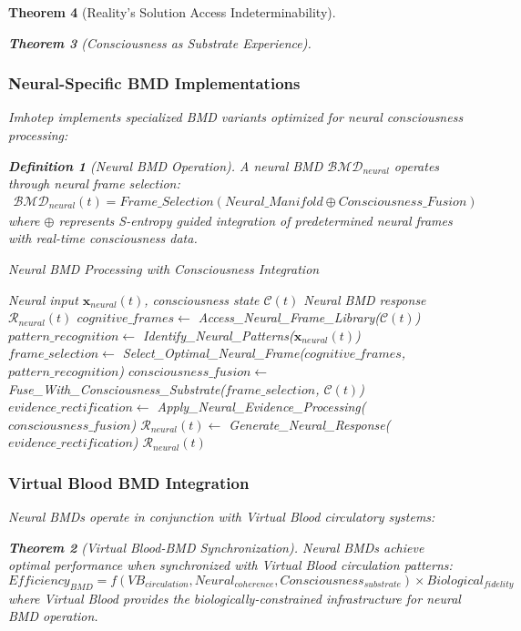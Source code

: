 \documentclass[12pt,a4paper]{article}
\newtheorem{theorem}{Theorem}[section]
\newtheorem{definition}[theorem]{Definition}
\theoremstyle{remark}
\begin{document}
\begin{theorem}[Reality's Solution Access Indeterminability]
\begin{theorem}[Consciousness as Substrate Experience]
\subsubsection{Neural-Specific BMD Implementations}

Imhotep implements specialized BMD variants optimized for neural consciousness processing:

\begin{definition}[Neural BMD Operation]
A neural BMD $\mathcal{BMD}_{neural}$ operates through neural frame selection:
\begin{align}
\mathcal{BMD}_{neural}(t) = Frame\_Selection(Neural\_Manifold \oplus Consciousness\_Fusion)
\end{align}
where $\oplus$ represents S-entropy guided integration of predetermined neural frames with real-time consciousness data.
\end{definition}

\begin{algorithm}
\caption{Neural BMD Processing with Consciousness Integration}
\begin{algorithmic}[1]
\REQUIRE Neural input $\mathbf{x}_{neural}(t)$, consciousness state $\mathcal{C}(t)$
\ENSURE Neural BMD response $\mathcal{R}_{neural}(t)$
\STATE $cognitive\_frames \leftarrow$ Access\_Neural\_Frame\_Library($\mathcal{C}(t)$)
\STATE $pattern\_recognition \leftarrow$ Identify\_Neural\_Patterns($\mathbf{x}_{neural}(t)$)
\STATE $frame\_selection \leftarrow$ Select\_Optimal\_Neural\_Frame($cognitive\_frames$, $pattern\_recognition$)
\STATE $consciousness\_fusion \leftarrow$ Fuse\_With\_Consciousness\_Substrate($frame\_selection$, $\mathcal{C}(t)$)
\STATE $evidence\_rectification \leftarrow$ Apply\_Neural\_Evidence\_Processing($consciousness\_fusion$)
\STATE $\mathcal{R}_{neural}(t) \leftarrow$ Generate\_Neural\_Response($evidence\_rectification$)
\RETURN $\mathcal{R}_{neural}(t)$
\end{algorithmic}
\end{algorithm}

\subsubsection{Virtual Blood BMD Integration}

Neural BMDs operate in conjunction with Virtual Blood circulatory systems:

\begin{theorem}[Virtual Blood-BMD Synchronization]
Neural BMDs achieve optimal performance when synchronized with Virtual Blood circulation patterns:
\begin{equation}
Efficiency_{BMD} = f(VB_{circulation}, Neural_{coherence}, Consciousness_{substrate}) \times Biological_{fidelity}
\end{equation}
where Virtual Blood provides the biologically-constrained infrastructure for neural BMD operation.
\end{theorem}


\end{theorem}
\end{theorem}
\end{document}
